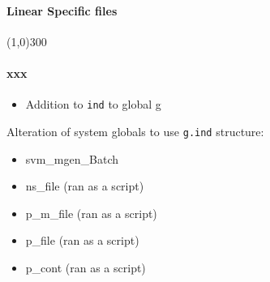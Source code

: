 \documentclass[12pt]{article}
\begin{document}
\paragraph{Linear Specific files}\line(1,0){300}

\paragraph{xxx}
	\begin{itemize}
		\item Addition to \verb|ind| to global g
	\end{itemize}
			
			
Alteration of system globals to use \verb|g.ind| structure:

	\begin{itemize}
		\item svm\_mgen\_Batch
		\item ns\_file (ran as a script)
		\item p\_m\_file (ran as a script)
		\item p\_file (ran as a script)
		\item p\_cont (ran as a script)
	\end{itemize}
	
	
\end{document}
